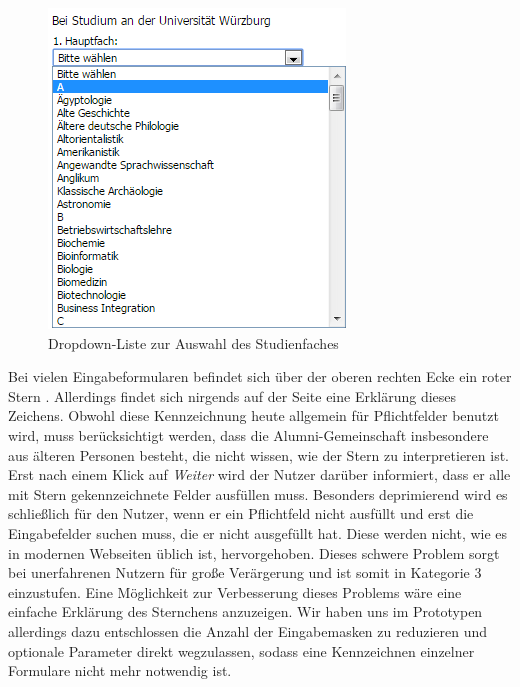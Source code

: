 \begin{figure}
	\centering
		\includegraphics{figures/dropdownlist.png}
	\caption{Dropdown-Liste zur Auswahl des Studienfaches}
	\label{fig:regdropdown}
\end{figure}

{Bei vielen Eingabeformularen befindet sich über der oberen rechten Ecke ein roter Stern \glqq *\grqq. Allerdings findet sich nirgends auf der Seite eine Erklärung dieses Zeichens.
Obwohl diese Kennzeichnung heute allgemein für Pflichtfelder benutzt wird, muss berücksichtigt werden, dass die Alumni-Gemeinschaft insbesondere aus älteren Personen besteht, die nicht wissen, wie der Stern zu interpretieren ist. Erst nach einem Klick auf \emph{Weiter} wird der Nutzer darüber informiert, dass er alle mit Stern gekennzeichnete Felder ausfüllen muss.
}
{Besonders deprimierend wird es schließlich für den Nutzer, wenn er ein Pflichtfeld nicht ausfüllt und erst die Eingabefelder suchen muss, die er nicht ausgefüllt hat. Diese werden nicht, wie es in modernen Webseiten üblich ist, hervorgehoben. Dieses schwere Problem sorgt bei unerfahrenen Nutzern für große Verärgerung und ist somit in Kategorie 3 einzustufen.
}
{Eine Möglichkeit zur Verbesserung dieses Problems wäre eine einfache Erklärung des Sternchens anzuzeigen. Wir haben uns im Prototypen allerdings dazu entschlossen die Anzahl der Eingabemasken zu reduzieren und optionale Parameter direkt wegzulassen, sodass eine Kennzeichnen einzelner Formulare nicht mehr notwendig ist.
}

